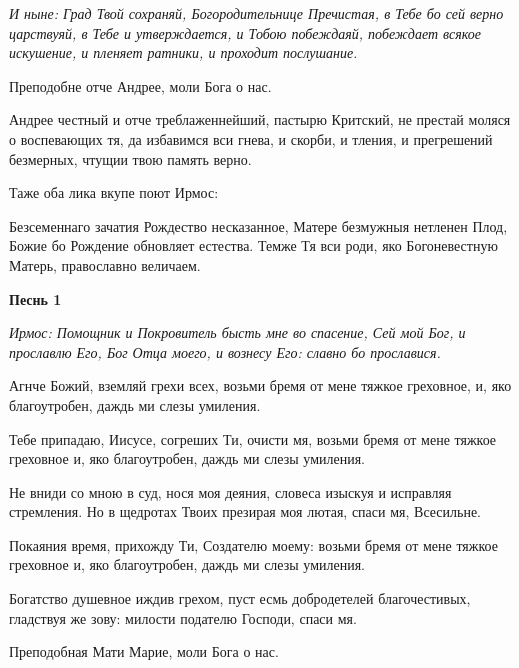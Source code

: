 \itshape И ныне\normalfont{}: Град Твой сохраняй, Богородительнице Пречистая, в Тебе бо сей верно царствуяй, в Тебе и утверждается, и Тобою побеждаяй, побеждает всякое искушение, и пленяет ратники, и проходит послушание. 

\bfseries 

Преподобне отче Андрее, моли Бога о нас.\normalfont{}

Андрее честный и отче треблаженнейший, пастырю Критский, не престай моляся о воспевающих тя, да избавимся вси гнева, и скорби, и тления, и прегрешений безмерных, чтущии твою память верно. 

\itshape 

Таже оба лика вкупе поют Ирмос\normalfont{}:

Безсеменнаго зачатия Рождество несказанное, Матере безмужныя нетленен Плод, Божие бо Рождение обновляет естества. Темже Тя вси роди, яко Богоневестную Матерь, православно величаем.

 



\bigskip\bigskip\mychapterending

 


\bfseries Песнь 1\normalfont{}

\itshape Ирмос\normalfont{}: Помощник и Покровитель бысть мне во спасение, Сей мой Бог, и прославлю Его, Бог Отца моего, и вознесу Его: славно бо прославися. 

Агнче Божий, вземляй грехи всех, возьми бремя от мене тяжкое греховное, и, яко благоутробен, даждь ми слезы умиления. 

Тебе припадаю, Иисусе, согреших Ти, очисти мя, возьми бремя от мене тяжкое греховное и, яко благоутробен, даждь ми слезы умиления. 

Не вниди со мною в суд, нося моя деяния, словеса изыскуя и исправляя стремления. Но в щедротах Твоих презирая моя лютая, спаси мя, Всесильне. 

Покаяния время, прихожду Ти, Создателю моему: возьми бремя от мене тяжкое греховное и, яко благоутробен, даждь ми слезы умиления. 

Богатство душевное иждив грехом, пуст есмь добродетелей благочестивых, гладствуя же зову: милости подателю Господи, спаси мя. 

\bfseries 

Преподобная Мати Марие, моли Бога о нас.

\normalfont{}

